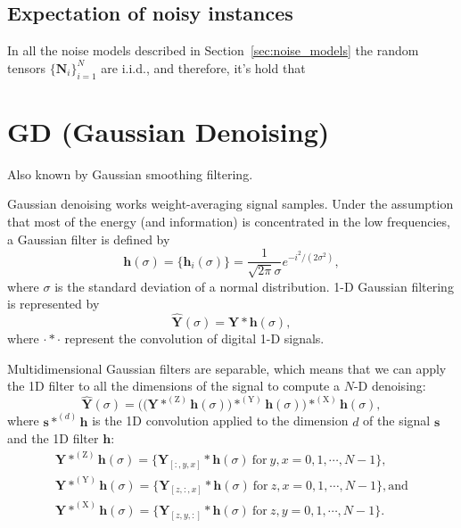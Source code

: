 \documentclass{article}
\begin{document}
\subsection{Expectation of noisy instances}
In all the noise models described in Section~\ref{sec:noise_models}
the random tensors $\{{\mathbf N}_i\}_{i=1}^N$ are i.i.d., and therefore,
it's hold that





\section{GD (Gaussian Denoising)}

Also known by Gaussian smoothing filtering.

Gaussian denoising works weight-averaging signal samples. Under the
assumption that most of the energy (and information) is concentrated
in the low frequencies, a Gaussian filter is defined by
\begin{equation}
  \mathbf{h}(\sigma) = \{\mathbf{h}_i(\sigma)\} = \frac{1}{\sqrt{2\pi}\sigma}e^{{-i}^2/(2\sigma^2)},
\end{equation}
where $\sigma$ is the standard deviation of a normal
distribution. 1-D Gaussian filtering is represented by
\begin{equation}
  \hat{\mathbf{Y}}(\sigma) = \mathbf{Y}*\mathbf{h}(\sigma),
  \label{eq:GF}
\end{equation}
where $\cdot*\cdot$ represent the convolution of digital 1-D signals.

Multidimensional Gaussian filters are separable, which means that we
can apply the 1D filter to all the dimensions of the signal to compute
a $N$-D denoising:
\begin{equation}
  \hat{\mathbf{Y}}(\sigma) = \Big(\big({\mathbf Y}*^{(\text{Z})}{\mathbf h}(\sigma)\big)*^{(\text{Y})}{\mathbf h}(\sigma)\Big)*^{(\text{X})}{\mathbf h}(\sigma),
    \label{eq:3DGF}
\end{equation}
where ${\mathbf s}*^{(d)}{\mathbf h}$ is the 1D convolution applied to
the dimension $d$ of the signal ${\mathbf s}$ and the 1D filter
${\mathbf h}$:
\begin{equation*}
    \begin{array}{l}
    \mathbf{Y}*^{(\text{Z})}{\mathbf h}(\sigma)=\{{\mathbf Y}_{[:,y,x]}*{\mathbf h}(\sigma)~\text{for}~y,x=0,1,\cdots,N-1\},\\
    \mathbf{Y}*^{(\text{Y})}{\mathbf h}(\sigma)=\{{\mathbf Y}_{[z,:,x]}*{\mathbf h}(\sigma)~\text{for}~z,x=0,1,\cdots,N-1\}, \text{and}\\
    \mathbf{Y}*^{(\text{X})}{\mathbf h}(\sigma)=\{{\mathbf Y}_{[z,y,:]}*{\mathbf h}(\sigma)~\text{for}~z,y=0,1,\cdots,N-1\}.
    \end{array}
\end{equation*}
\end{document}

